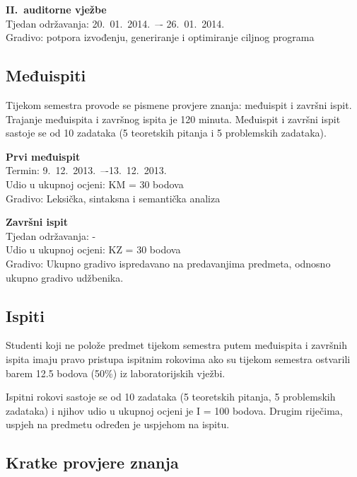 \documentclass[times, 12pt, utf8]{book}
\begin{document}
\textbf{II.~auditorne vježbe} \\
Tjedan održavanja: 20.~01.~2014.~–- 26.~01.~2014. \\
Gradivo: potpora izvođenju, generiranje i optimiranje ciljnog programa


\cleardoublepage  
{}  
{}
\subsection*{Međuispiti}

Tijekom semestra provode se pismene provjere znanja: međuispit i završni ispit.
Trajanje međuispita i završnog ispita je 120 minuta.
Međuispit i završni ispit sastoje se od 10 zadataka (5 teoretskih pitanja i 5 problemskih zadataka).

\textbf{Prvi međuispit} \\
Termin: 9.~12.~2013.~–-13.~12.~2013. \\
Udio u ukupnoj ocjeni:  KM = 30 bodova \\
Gradivo: Leksička, sintaksna i semantička analiza

\textbf{Završni ispit} \\
Tjedan održavanja: - \\
Udio u ukupnoj ocjeni: KZ = 30 bodova \\
Gradivo: Ukupno gradivo ispredavano na predavanjima predmeta, odnosno ukupno gradivo udžbenika.

\cleardoublepage  
{}  
{}
\subsection*{Ispiti}

Studenti koji ne polože predmet tijekom semestra putem međuispita i završnih ispita imaju pravo pristupa ispitnim rokovima ako su tijekom semestra ostvarili barem 12.5 bodova (50\%) iz laboratorijskih vježbi.

Ispitni rokovi sastoje se od 10 zadataka (5 teoretskih pitanja, 5 problemskih zadataka) i njihov udio u ukupnoj ocjeni je I = 100 bodova.
Drugim riječima, uspjeh na predmetu određen je uspjehom na ispitu.

\cleardoublepage  
{}  
{}
\subsection*{Kratke provjere znanja}
\end{document}

